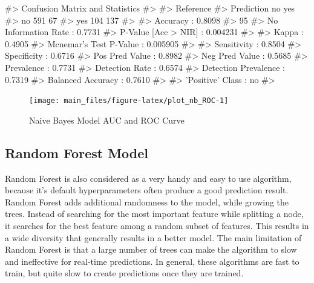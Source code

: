 \begin{Schunk}
\begin{Soutput}
#> Confusion Matrix and Statistics
#> 
#>           Reference
#> Prediction  no yes
#>        no  591  67
#>        yes 104 137
#>                                          
#>                Accuracy : 0.8098         
#>                  95%
#>     No Information Rate : 0.7731         
#>     P-Value [Acc > NIR] : 0.004231       
#>                                          
#>                   Kappa : 0.4905         
#>  Mcnemar's Test P-Value : 0.005905       
#>                                          
#>             Sensitivity : 0.8504         
#>             Specificity : 0.6716         
#>          Pos Pred Value : 0.8982         
#>          Neg Pred Value : 0.5685         
#>              Prevalence : 0.7731         
#>          Detection Rate : 0.6574         
#>    Detection Prevalence : 0.7319         
#>       Balanced Accuracy : 0.7610         
#>                                          
#>        'Positive' Class : no             
#> 
\end{Soutput}
\end{Schunk}

\begin{Schunk}
\begin{figure}[H]

{\centering \texttt{[image: main\_files/figure-latex/plot\_nb\_ROC-1]} 

}

\caption[Naive Bayes Model AUC and ROC Curve]{Naive Bayes Model AUC and ROC Curve}\label{fig:plot_nb_ROC}
\end{figure}
\end{Schunk}

\hypertarget{random-forest-model}{%
\subsection{Random Forest Model}\label{random-forest-model}}

Random Forest is also considered as a very handy and easy to use
algorithm, because it's default hyperparameters often produce a good
prediction result. Random Forest adds additional randomness to the
model, while growing the trees. Instead of searching for the most
important feature while splitting a node, it searches for the best
feature among a random subset of features. This results in a wide
diversity that generally results in a better model. The main limitation
of Random Forest is that a large number of trees can make the algorithm
to slow and ineffective for real-time predictions. In general, these
algorithms are fast to train, but quite slow to create predictions once
they are trained.

